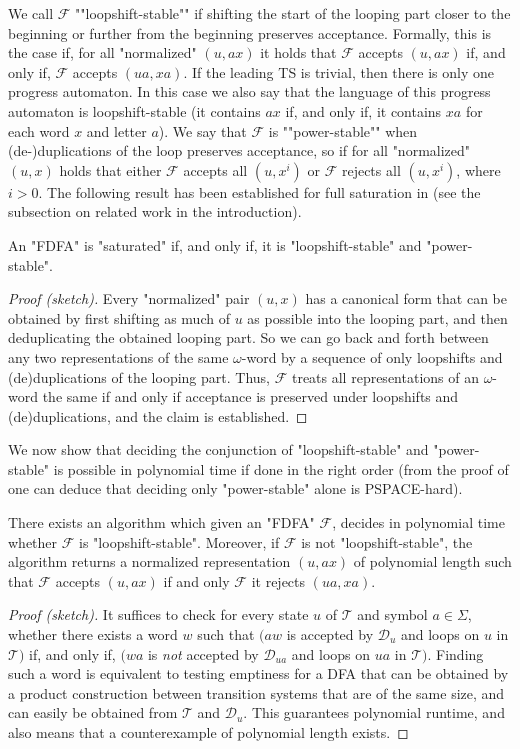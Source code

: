 \documentclass[a4paper,USenglish,cleveref,autoref,thm-restate]{lipics-v2021}
\newcommand{\mc}[1]{\ensuremath{\mathcal{#1}}}
\newcommand{\T}{\mc{T}}
\newcommand{\F}{\mc{F}}
\newcommand{\D}{\mc{D}}
\newcommand{\PSPACE}{\textsf{PSPACE}\xspace}
\begin{document}
\AP
We call $\F$ ""loopshift-stable"" if shifting the start of the looping part closer to the beginning or further from the beginning preserves acceptance.
Formally, this is the case if, for all "normalized" $(u,ax)$ it holds that $\F$ accepts $(u,ax)$ if, and only if, $\F$ accepts $(ua,xa)$. If the leading TS is trivial, then there is only one progress automaton. In this case we also say that the language of this progress automaton is loopshift-stable (it contains $ax$ if, and only if, it contains $xa$ for each word $x$ and letter $a$).
\AP
We say that $\F$ is ""power-stable"" when (de-)duplications of the loop preserves acceptance, so if for all "normalized" $(u,x)$ holds that either $\F$ accepts all $(u,x^i)$ or $\F$ rejects all $(u,x^i)$, where $i > 0$.
The following result has been established for full saturation in \cite{CianciaV12,CianciaV19} (see the subsection on related work in the introduction).

\begin{lemma}
  An "FDFA" is "saturated" if, and only if, it is "loopshift-stable" and "power-stable".\label{lemma:fdfasaturationcharacterisation}
\end{lemma}
\begin{proof}[Proof (sketch)]
Every "normalized" pair $(u,x)$ has a canonical form that can be obtained by first shifting as much of $u$ as possible into the looping part, and then deduplicating the obtained looping part.
So we can go back and forth between any two representations of the same $\omega$-word by a sequence of only loopshifts and (de)duplications of the looping part.
Thus, $\F$ treats all representations of an $\omega$-word the same if and only if acceptance is preserved under loopshifts and (de)duplications, and the claim is established.
\end{proof}
We now show that deciding the conjunction of "loopshift-stable" and "power-stable" is possible in polynomial time if done in the right order (from the proof of  one can deduce that deciding only "power-stable" alone is \PSPACE-hard). 
\begin{lemma}
    There exists an algorithm which given an "FDFA" $\F$, decides in polynomial time whether $\F$ is "loopshift-stable".
    Moreover, if $\F$ is not "loopshift-stable", the algorithm returns a normalized representation $(u,ax)$ of polynomial length such that $\F$ accepts $(u,ax)$ if and only $\F$ it rejects $(ua,xa)$.
  \label{lemma:rotationinvariancedecidable}
\end{lemma}
\begin{proof}[Proof (sketch)]
It suffices to check for every state $u$ of $\T$ and symbol $a \in \Sigma$, whether there exists a word $w$ such that
$\big(aw$ is accepted by $\D_u$ and loops on $u$ in $\T\big)$
if, and only if,
$\big(wa$ is \emph{not} accepted by $\D_{ua}$ and loops on $ua$ in $\T\big)$.
Finding such a word is equivalent to testing emptiness for a DFA that can be obtained by a product construction between transition systems that are of the same size, and can easily be obtained from $\T$ and $\D_u$.
This guarantees polynomial runtime, and also means that a counterexample of polynomial length exists.
\end{proof}
\end{document}
